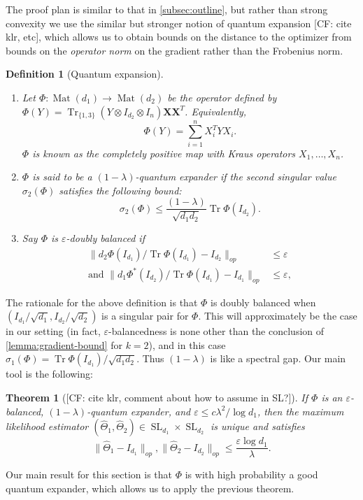 \documentclass{article}
\newtheorem{theorem}{Theorem}
\newtheorem{definition}{Definition}
\newcommand{\ot}{\otimes}
\newcommand{\mat}{\operatorname{Mat}}
\renewcommand{\vec}{\bm}
\newcommand\eps{\varepsilon}
\newcommand\SL{\operatorname{SL}}
\newcommand\tr{\operatorname{Tr}}
\newcommand{\CF}[1]{{\color{purple}[CF: #1]}}
\begin{document}
The proof plan is similar to that in \cref{subsec:outline}, but rather than strong convexity we use the similar but stronger notion of quantum expansion \CF{cite klr, etc}, which allows us to obtain bounds on the distance to the optimizer from bounds on the \emph{operator norm} on the gradient rather than the Frobenius norm.

\begin{definition}[Quantum expansion]
$ $
\begin{enumerate}
\item Let $\Phi:\mat(d_1) \to \mat(d_2)$ be the operator defined by $\Phi(Y) = \tr_{\{1,3\}} ( Y \ot I_{d_2} \ot I_{n}) \vec X \vec X^T$. Equivalently,
$$\Phi(Y) = \sum_{i = 1}^n X_i^T Y X_i.$$
$\Phi$ is known as the \emph{completely positive map} with Kraus operators $X_1, \dots, X_n$.
\item $\Phi$ is said to be a \emph{$(1 - \lambda)$-quantum expander} if the second singular value $\sigma_2(\Phi)$ satisfies the following bound:
$$\sigma_2(\Phi) \leq \frac{(1 - \lambda)}{\sqrt{d_1d_2}} \tr \Phi(I_{d_2}).$$
\item Say $\Phi$ is \emph{$\eps$-doubly balanced} if
\begin{align*}
\|d_2 \Phi(I_{d_1})/\tr \Phi(I_{d_1})  - I_{d_2} \|_{op}& \leq \eps\\
\textrm{and }\|d_1 \Phi^*(I_{d_2})/\tr \Phi(I_{d_1})  - I_{d_1}  \|_{op} & \leq \eps,
\end{align*}
\end{enumerate}
\end{definition}

The rationale for the above definition is that $\Phi$ is doubly balanced when $(I_{d_1}/\sqrt{d_1}, I_{d_2}/\sqrt{d_2})$ is a singular pair for $\Phi$. This will approximately be the case in our setting (in fact, $\eps$-balancedness is none other than the conclusion of \cref{lemma:gradient-bound} for $k = 2$), and in this case $\sigma_1(\Phi) =  \tr \Phi(I_{d_1})/\sqrt{d_1 d_2}.$ Thus $(1-\lambda)$ is like a spectral gap.
Our main tool is the following:


\begin{theorem}[\CF{cite klr, comment about how to assume in SL?}]\label{thm:klr}
If $\Phi$ is an $\eps$-balanced, $(1 - \lambda)$-quantum expander, and $\eps \leq c \lambda^2/\log d_1$, then the maximum likelihood estimator $(\widehat{\Theta}_1, \widehat{\Theta}_2) \in \SL_{d_1}\times \SL_{d_2}$ is unique and satisfies
$$\| \widehat{\Theta}_1 - I_{d_1}\|_{op}, \| \widehat{\Theta}_2 - I_{d_2}\|_{op} \leq \frac{\eps \log d_1}{\lambda}.$$
\end{theorem}
Our main result for this section is that $\Phi$ is with high probability a good quantum expander, which allows us to apply the previous theorem.
\end{document}
